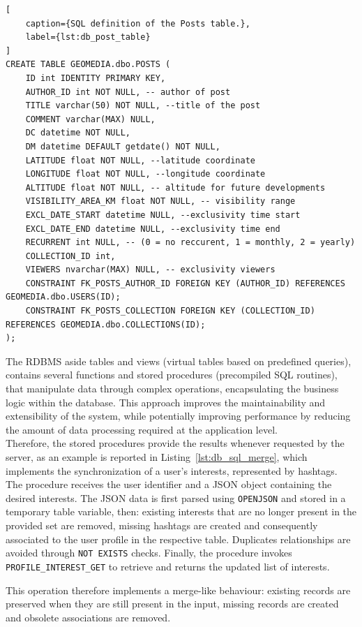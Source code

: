 \begin{lstlisting}[
    caption={SQL definition of the Posts table.},
    label={lst:db_post_table}
]
CREATE TABLE GEOMEDIA.dbo.POSTS (
	ID int IDENTITY PRIMARY KEY,
	AUTHOR_ID int NOT NULL, -- author of post
	TITLE varchar(50) NOT NULL, --title of the post
	COMMENT varchar(MAX) NULL,
	DC datetime NOT NULL,
	DM datetime DEFAULT getdate() NOT NULL,
	LATITUDE float NOT NULL, --latitude coordinate
	LONGITUDE float NOT NULL, --longitude coordinate
	ALTITUDE float NOT NULL, -- altitude for future developments
	VISIBILITY_AREA_KM float NOT NULL, -- visibility range
	EXCL_DATE_START datetime NULL, --exclusivity time start
	EXCL_DATE_END datetime NULL, --exclusivity time end
	RECURRENT int NULL, -- (0 = no reccurent, 1 = monthly, 2 = yearly)
	COLLECTION_ID int, 
	VIEWERS nvarchar(MAX) NULL, -- exclusivity viewers
    CONSTRAINT FK_POSTS_AUTHOR_ID FOREIGN KEY (AUTHOR_ID) REFERENCES GEOMEDIA.dbo.USERS(ID);
    CONSTRAINT FK_POSTS_COLLECTION FOREIGN KEY (COLLECTION_ID) REFERENCES GEOMEDIA.dbo.COLLECTIONS(ID);
);
\end{lstlisting}

The RDBMS aside tables and views (virtual tables based on predefined queries), contains several functions and stored procedures (precompiled SQL routines), that manipulate data through complex operations, encapsulating the business logic within the database. This approach improves the maintainability and extensibility of the system, while potentially improving performance by reducing the amount of data processing required at the application level. \\
Therefore, the stored procedures provide the results whenever requested by the server, as an example is reported in Listing~\ref{lst:db_sql_merge}, which implements the synchronization of a user's interests, represented by hashtags. The procedure receives the user identifier and a JSON object containing the desired interests. The JSON data is first parsed using \texttt{OPENJSON} and stored in a temporary table variable, then: existing interests that are no longer present in the provided set are removed, missing hashtags are created and consequently associated to the user profile in the respective table. Duplicates relationships are avoided through \texttt{NOT EXISTS} checks. Finally, the procedure invokes \texttt{PROFILE\_INTEREST\_GET} to retrieve and returns the updated list of interests.

This operation therefore implements a merge-like behaviour: existing records are preserved when they are still present in the input, missing records are created and obsolete associations are removed.

